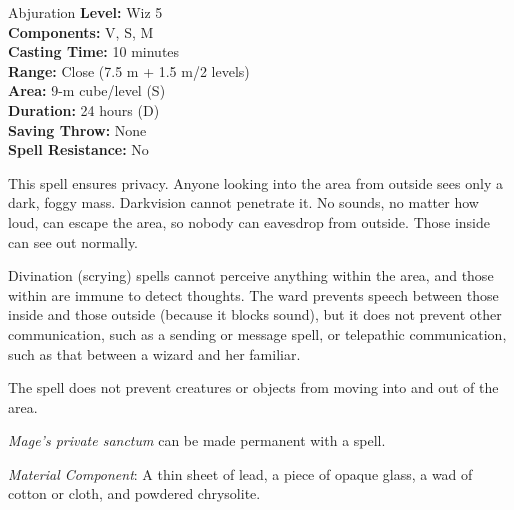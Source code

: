 {Abjuration}
{
	\textbf{Level:}
	Wiz 5\\
	\textbf{Components:}
	V, S, M\\
	\textbf{Casting Time:}
	10 minutes\\
	\textbf{Range:}
	Close (7.5 m + 1.5 m/2 levels)\\
	\textbf{Area:}
	9-m cube/level (S)\\
	\textbf{Duration:}
	24 hours (D)\\
	\textbf{Saving Throw:}
	None\\
	\textbf{Spell Resistance:}
	No\\
}
{
	This spell ensures privacy. Anyone looking into the area from outside sees only a dark, foggy mass. Darkvision cannot penetrate it. No sounds, no matter how loud, can escape the area, so nobody can eavesdrop from outside. Those inside can see out normally.

	Divination (scrying) spells cannot perceive anything within the area, and those within are immune to detect thoughts. The ward prevents speech between those inside and those outside (because it blocks sound), but it does not prevent other communication, such as a sending or message spell, or telepathic communication, such as that between a wizard and her familiar.

	The spell does not prevent creatures or objects from moving into and out of the area.

	\emph{Mage's private sanctum} can be made permanent with a  spell.

	\textit{Material Component}:
	A thin sheet of lead, a piece of opaque glass, a wad of cotton or cloth, and powdered chrysolite.

}
